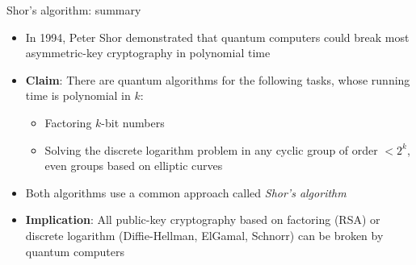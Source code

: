 \documentclass[aspectratio=169, lualatex]{beamer} %
\begin{document}
\begin{frame}{Shor's algorithm: summary}
	\begin{itemize}
		\item In 1994, Peter Shor demonstrated that quantum computers could break most asymmetric-key cryptography in polynomial time
		\item \textbf{Claim}: There are quantum algorithms for the following tasks, whose running time is polynomial in $k$:
		      \begin{itemize}
			      \item Factoring $k$-bit numbers
			      \item Solving the discrete logarithm problem in any cyclic group of order $< 2^k$, even groups based on elliptic curves
		      \end{itemize}
		\item Both algorithms use a common approach called \textit{Shor's algorithm}
		\item \textbf{Implication}: All public-key cryptography based on factoring (RSA) or discrete logarithm (Diffie-Hellman, ElGamal, Schnorr) can be broken by quantum computers
	\end{itemize}
\end{frame}
\end{document}
